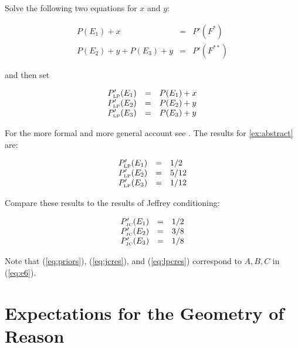 \documentclass[smallextended]{svjour3}       %
\begin{document}
Solve the following two equations for $x$ and $y$:

\begin{equation}
  \label{eq:lpce}
  \begin{array}{rcl}
    P(E_{1})+x&=&P'(F^{*}) \\
    P(E_{2})+y+P(E_{3})+y&=&P'(F^{**})
  \end{array}
\end{equation}

and then set

\begin{equation}
  \label{eq:lpcf}
  \begin{array}{rcl}
    P'_{\mbox{\tiny LP}}(E_{1})&=&P(E_{1})+x \\
    P'_{\mbox{\tiny LP}}(E_{2})&=&P(E_{2})+y \\
    P'_{\mbox{\tiny LP}}(E_{3})&=&P(E_{3})+y
  \end{array}
\end{equation}

For the more formal and more general account see
. The results for {\xample}
\ref{ex:abstract} are:

\begin{equation}
  \label{eq:lpcres}
  \begin{array}{rcl}
    P'_{\mbox{\tiny LP}}(E_{1})&=&1/2 \\
    P'_{\mbox{\tiny LP}}(E_{2})&=&5/12 \\
    P'_{\mbox{\tiny LP}}(E_{3})&=&1/12
  \end{array}
\end{equation}

Compare these results to the results of Jeffrey conditioning:

\begin{equation}
  \label{eq:jcres}
  \begin{array}{rcl}
    P'_{\mbox{\tiny JC}}(E_{1})&=&1/2 \\
    P'_{\mbox{\tiny JC}}(E_{2})&=&3/8 \\
    P'_{\mbox{\tiny JC}}(E_{3})&=&1/8
  \end{array}
\end{equation}

Note that (\ref{eq:priors}), (\ref{eq:jcres}), and (\ref{eq:lpcres})
correspond to $A,B,C$ in (\ref{eq:e6}). 

\section{Expectations for the Geometry of Reason}
\label{fivex}
\end{document}
